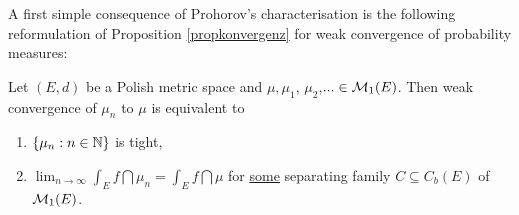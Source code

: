 A first simple consequence of Prohorov's characterisation is the following reformulation of Proposition \ref{propkonvergenz} for weak convergence of probability measures:
\begin{lAussageWerkzeug}
\begin{prop}\label{most_useful_characterization_weak_convergence}
	Let $(E,d)$ be a Polish metric space and $\mu,\mu_1$, $\mu_2$,$...\in \mathcal{M}_1(E)$. Then weak convergence of $\mu_n$ to $\mu$ is equivalent to
	\begin{enumerate}[label=(\roman*)]
			\item $\{\mu_n:n\in\mathbb{N}\}$ is tight,
			\item $ \lim_{n\to\infty} \int_E f \dint \mu_n = \int_E f \dint \mu$ for \underline{some} separating family $C \subseteq C_b(E)$ of $\mathcal{M}_1(E)$.
		\end{enumerate}
\end{prop}
\end{lAussageWerkzeug}
